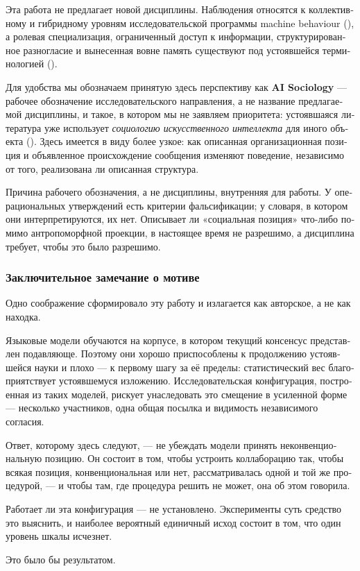 \begin{russian}
Эта работа не предлагает новой дисциплины. Наблюдения относятся к коллективному и гибридному уровням исследовательской программы machine behaviour (), а ролевая специализация, ограниченный доступ к информации, структурированное разногласие и вынесенная вовне память существуют под устоявшейся терминологией ().

Для удобства мы обозначаем принятую здесь перспективу как \textbf{AI Sociology} — рабочее обозначение исследовательского направления, а не название предлагаемой дисциплины, и такое, в котором мы не заявляем приоритета: устоявшаяся литература уже использует \emph{социологию искусственного интеллекта} для иного объекта (). Здесь имеется в виду более узкое: как описанная организационная позиция и объявленное происхождение сообщения изменяют поведение, независимо от того, реализована ли описанная структура.

Причина рабочего обозначения, а не дисциплины, внутренняя для работы. У операциональных утверждений есть критерии фальсификации; у словаря, в котором они интерпретируются, их нет. Описывает ли «социальная позиция» что-либо помимо антропоморфной проекции, в настоящее время не разрешимо, а дисциплина требует, чтобы это было разрешимо.


\subsubsection*{Заключительное замечание о мотиве}
\label{sec:ru:x--30}

Одно соображение сформировало эту работу и излагается как авторское, а не как находка.

Языковые модели обучаются на корпусе, в котором текущий консенсус представлен подавляюще. Поэтому они хорошо приспособлены к продолжению устоявшейся науки и плохо — к первому шагу за её пределы: статистический вес благоприятствует устоявшемуся изложению. Исследовательская конфигурация, построенная из таких моделей, рискует унаследовать это смещение в усиленной форме — несколько участников, одна общая посылка и видимость независимого согласия.

Ответ, которому здесь следуют, — не убеждать модели принять неконвенциональную позицию. Он состоит в том, чтобы устроить коллаборацию так, чтобы всякая позиция, конвенциональная или нет, рассматривалась одной и той же процедурой, — и чтобы там, где процедура решить не может, она об этом говорила.

Работает ли эта конфигурация — не установлено. Эксперименты  суть средство это выяснить, и наиболее вероятный единичный исход состоит в том, что один уровень шкалы исчезнет.

Это было бы результатом.

\end{russian}


